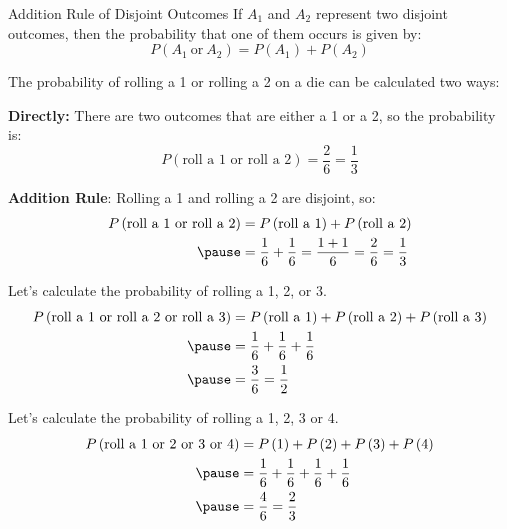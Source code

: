 \documentclass{beamer}
\newcommand{\prob}[1]{P\left(#1\right)}
\begin{document}
\begin{frame}
\begin{block}{Addition Rule of Disjoint Outcomes}
If $A_1$ and $A_2$ represent two disjoint outcomes, then the probability that one of them occurs is given by:
\begin{equation*}
\prob{A_1~\text{or}~A_2} = \prob{A_1} + \prob{A_2}
\end{equation*}
\end{block}\pause

\begin{example}
The probability of rolling a 1 or rolling a 2 on a die can be calculated two ways:\pause

\vspace{1mm}
\textbf{Directly:} There are two outcomes that are either a 1 or a 2, so the probability is:
\begin{equation*}
\prob{\text{roll a 1 or roll a 2}} = \dfrac{2}{6} = \dfrac{1}{3}
\end{equation*}\pause

\vspace{-4mm}
\textbf{Addition Rule}: Rolling a 1 and rolling a 2 are disjoint, so:
\begin{equation*}
\begin{aligned}
\prob{\text{roll a 1 or roll a 2}} &= \prob{\text{roll a 1}} + \prob{\text{roll a 2}} \\\pause
&= \dfrac{1}{6} + \dfrac{1}{6}
= \dfrac{1+1}{6} 
= \dfrac{2}{6} 
= \dfrac{1}{3}
\end{aligned}
\end{equation*}
\end{example}
\end{frame}

\begin{frame}
\begin{example}
Let's calculate the probability of rolling a 1, 2, or 3.\pause
\begin{equation*}
\begin{aligned}
\prob{\text{roll a 1 or roll a 2 or roll a 3}} &= \prob{\text{roll a 1}} + \prob{\text{roll a 2}} + \prob{\text{roll a 3}} \\\pause
&= \dfrac{1}{6} + \dfrac{1}{6} + \dfrac{1}{6}\\\pause
&=\dfrac{3}{6}
=\dfrac{1}{2}
\end{aligned}
\end{equation*}
\end{example}\pause

\begin{example}
Let's calculate the probability of rolling a 1, 2, 3 or 4.\pause
\begin{equation*}
\begin{aligned}
\prob{\text{roll a 1 or 2 or 3 or 4}} &= \prob{\text{1}} + \prob{\text{2}} + \prob{\text{3}} + \prob{\text{4}}  \\\pause
&= \dfrac{1}{6} + \dfrac{1}{6} + \dfrac{1}{6}+ \dfrac{1}{6}\\\pause
&=\dfrac{4}{6}
=\dfrac{2}{3}
\end{aligned}
\end{equation*}
\end{example}
\end{frame}
\end{document}
